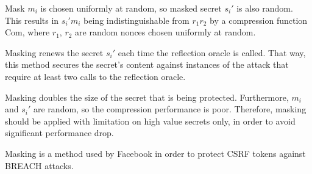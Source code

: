 \documentclass[conference, letterpaper, 10pt]{IEEEtran}
\begin{document}
Mask $m_i$ is chosen uniformly at random, so masked secret $s_i'$ is also
random. This results in $s_i' m_i$ being indistinguishable from $r_1 r_2$ by a
compression function $\textrm{Com}$, where $r_1$, $r_2$ are random nonces chosen
uniformly at random.

Masking renews the secret $s_i'$ each time the reflection oracle is called. That
way, this method secures the secret's content against instances of the attack
that require at least two calls to the reflection oracle.

Masking doubles the size of the secret that is being protected. Furthermore,
$m_i$ and $s_i'$ are random, so the compression performance is poor. Therefore,
masking should be applied with limitation on high value secrets only, in order
to avoid significant performance drop.

Masking is a method used by Facebook \cite{c11} in order to protect CSRF tokens
against BREACH attacks.
\end{document}

